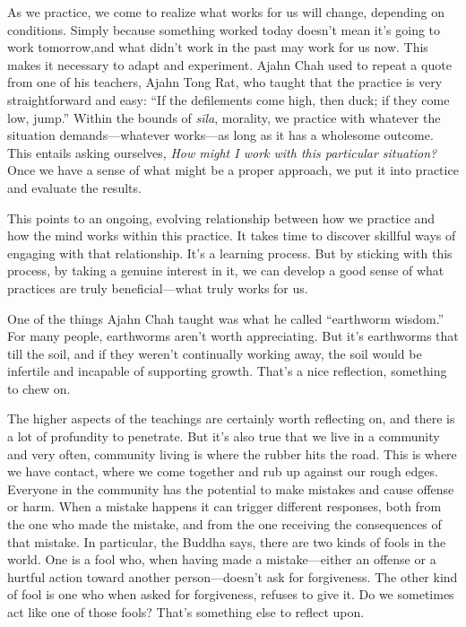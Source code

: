 As we practice, we come to realize what works for us will change, 
depending on conditions. Simply because something worked today doesn't 
mean it's going to work tomorrow,and what didn't work in the past may 
work for us now. This makes it necessary to adapt and experiment. Ajahn 
Chah used to repeat a quote from one of his teachers, Ajahn Tong Rat, 
who taught that the practice is very straightforward and easy: ``If the 
defilements come high, then duck; if they come low, jump.'' Within the 
bounds of \emph{sīla}, morality, we practice with whatever the 
situation demands---whatever works---as long as it has a wholesome 
outcome. This entails asking ourselves, \emph{How might I work with 
this particular situation?} Once we have a sense of what might be a 
proper approach, we put it into practice and evaluate the results.

This points to an ongoing, evolving relationship between how we 
practice and how the mind works within this practice. It takes time to 
discover skillful ways of engaging with that relationship. It's a 
learning process. But by sticking with this \mbox{process,} by taking a 
genuine interest in it, we can develop a good sense of what practices 
are truly beneficial---what truly works for us.


One of the things Ajahn Chah taught was what he called ``earthworm 
wisdom.'' For many people, earthworms aren't worth appreciating. But 
it's earthworms that till the soil, and if they weren't continually 
working away, the soil would be infertile and incapable of supporting 
growth. That's a nice reflection, something to chew on.

The higher aspects of the teachings are certainly worth reflecting on, 
and there is a lot of profundity to penetrate. But it's also true that 
we live in a community and very often, community living is where the 
rubber hits the road. This is where we have contact, where we come 
together and rub up against our rough edges. Everyone in the community 
has the potential to make mistakes and cause offense or harm. When a 
mistake happens it can trigger different responses, both from the one 
who made the mistake, and from the one receiving the consequences of 
that mistake. In particular, the Buddha says, there are two kinds of 
fools in the world. One is a fool who, when having made a 
mistake---either an offense or a hurtful action toward another 
person---doesn't ask for forgiveness. The other kind of fool is one who 
when asked for forgiveness, refuses to give it. Do we sometimes act 
like one of those fools? That's something else to reflect upon.

